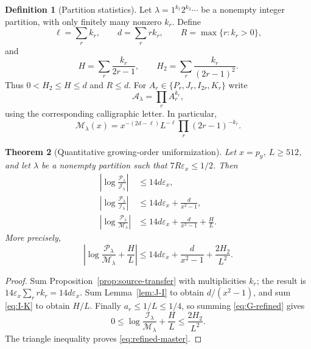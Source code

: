 \documentclass[11pt]{article}
\newtheorem{theorem}{Theorem}[section]
\theoremstyle{definition}
\newtheorem{definition}[theorem]{Definition}
\theoremstyle{remark}
\newcommand{\eps}{\varepsilon}
\newcommand{\cP}{\mathcal P}
\newcommand{\cJ}{\mathcal J}
\newcommand{\cI}{\mathcal I}
\newcommand{\cM}{\mathcal M}
\newcommand{\cA}{\mathcal A}
\begin{document}
\begin{definition}[Partition statistics]
Let $\lambda=1^{k_1}2^{k_2}\cdots$ be a nonempty integer partition, with
only finitely many nonzero $k_r$.  Define
\begin{equation}
 \ell=\sum_rk_r,\qquad d=\sum_rrk_r,\qquad
 R=\max\{r:k_r>0\},
 \label{eq:degree-order}
\end{equation}
and
\begin{equation}
 H=\sum_r\frac{k_r}{2r-1},\qquad
 H_2=\sum_r\frac{k_r}{(2r-1)^2}.
 \label{eq:H}
\end{equation}
Thus $0<H_2\le H\le d$ and $R\le d$.  For
$A_r\in\{P_r,J_r,I_{2r},K_r\}$ write
\[
 \cA_\lambda=\prod_r A_r^{k_r},
 \]
using the corresponding calligraphic letter.  In particular,
\begin{equation}
 \cM_\lambda(x)
 =x^{-(2d-\ell)}L^{-\ell}
  \prod_r(2r-1)^{-k_r}.
 \label{eq:Mlambda}
\end{equation}
\end{definition}

\begin{theorem}[Quantitative growing-order uniformization]
\label{thm:master}
Let $x=p_y$, $L\ge512$, and let $\lambda$ be a nonempty partition such
that $7R\eps_x\le1/2$.  Then
\begin{align}
 \left|\log\frac{\cP_\lambda}{\cJ_\lambda}\right|
 &\le14d\eps_x,
 \label{eq:ledger-J}\\
 \left|\log\frac{\cP_\lambda}{\cI_\lambda}\right|
 &\le14d\eps_x+\frac{d}{x^2-1},
 \label{eq:ledger-I}\\
 \left|\log\frac{\cP_\lambda}{\cM_\lambda}\right|
 &\le14d\eps_x+\frac{d}{x^2-1}+\frac{H}{L}.
 \label{eq:ledger-M}
\end{align}
More precisely,
\begin{equation}
 \boxed{
 \left|\log\frac{\cP_\lambda}{\cM_\lambda}+\frac{H}{L}\right|
 \le14d\eps_x+\frac{d}{x^2-1}+\frac{2H_2}{L^2}.}
 \label{eq:refined-master}
\end{equation}
\end{theorem}

\begin{proof}
Sum Proposition~\ref{prop:source-transfer} with multiplicities $k_r$;
the result is $14\eps_x\sum_r r k_r=14d\eps_x$.  Sum
Lemma~\ref{lem:J-I} to obtain $d/(x^2-1)$, and sum
\eqref{eq:I-K} to obtain $H/L$.  Finally $a_r\le1/L\le1/4$, so summing
\eqref{eq:G-refined} gives
\[
 0\le\log\frac{\cI_\lambda}{\cM_\lambda}+\frac HL
 \le\frac{2H_2}{L^2}.
\]
The triangle inequality proves \eqref{eq:refined-master}.
\end{proof}
\end{document}
